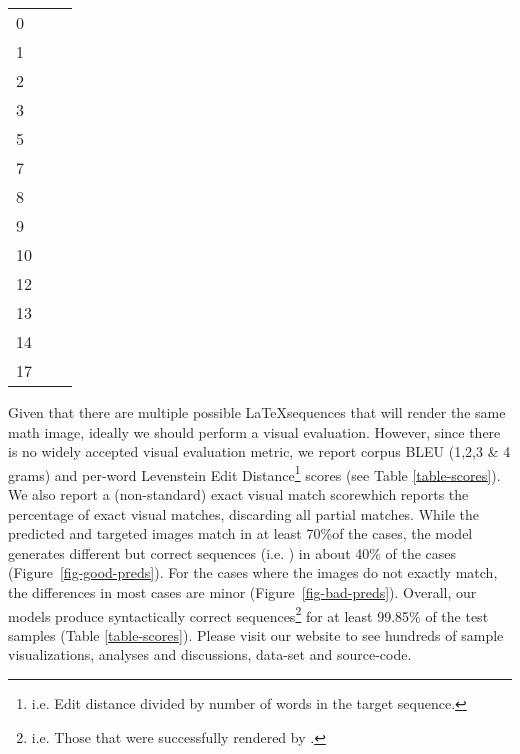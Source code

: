 \documentclass{article}
\begin{document}
\begin{figure*}
	\begin{tabular}{lll}
		&  &  \\
		\hline
		\scriptsize{0} &  &  \\
\scriptsize{1} &  &  \\
\scriptsize{2} &  &  \\
\scriptsize{3} &  &  \\
\scriptsize{5} &  &  \\
\scriptsize{7} &  &  \\
\scriptsize{8} &  &  \\
\scriptsize{9} &  &  \\
\scriptsize{10} &  &  \\
\scriptsize{12} &  &  \\
\scriptsize{13} &  &  \\
\scriptsize{14} &  &  \\
\scriptsize{17} &  &  \\
 	\end{tabular}
	\centering
	\caption[Random Sample of Mistakes]{A random sample of mistakes made by \textsc{i2l-strips}. Observe that usually the model gets most of the formula right and the mistake is only in a small portion of the overall formula (e.g. sample \# 1; generating one subscript  instead of an ). In some cases the mistake is in the font and in some cases the images are identical but were incorrectly flagged by the image-match evaluation software (e.g. sample \# 0 \& \#17). In some cases the predicted formula appears more correct than the original! (sample \# 10 where position of the subscript  has been `corrected' by \textsc{i2l-strips}).
}
	\label{fig-bad-preds}
\end{figure*}
Given that there are multiple possible \LaTeX sequences that will render the same math image, ideally we should perform a visual evaluation. However, since there is no widely accepted visual evaluation metric, we report corpus BLEU (1,2,3 \& 4 grams) and per-word Levenstein Edit Distance\footnote{i.e. Edit distance divided by number of words in the target sequence.} scores (see Table \ref{table-scores}). We also report a (non-standard) exact visual match score\footnotemark[103] which reports the percentage of exact visual matches, discarding all partial matches. While the predicted and targeted images match in at least 70\%\footnotemark[103] of the cases, the model generates different but correct sequences (i.e. ) in about 40\% of the cases (Figure~\ref{fig-good-preds}). For the cases where the images do not exactly match, the differences in most cases are minor (Figure~\ref{fig-bad-preds}). Overall, our models produce syntactically correct sequences\footnote{i.e. Those that were successfully rendered by \LaTeXe.} for at least 99.85\% of the test samples (Table \ref{table-scores}). Please visit our website to see hundreds of sample visualizations, analyses and discussions, data-set and source-code.
\end{document}
